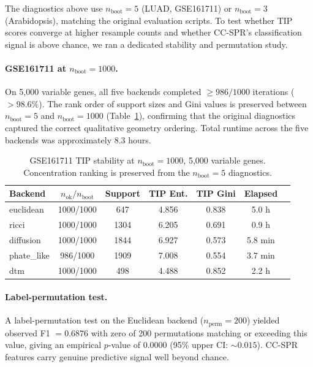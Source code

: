 \documentclass[12pt]{article}
\begin{document}
The diagnostics above use $n_{\text{boot}} = 5$ (LUAD, GSE161711) or $n_{\text{boot}} = 3$ (Arabidopsis), matching the original evaluation scripts.
To test whether TIP scores converge at higher resample counts and whether CC-SPR's classification signal is above chance, we ran a dedicated stability and permutation study.

\paragraph{GSE161711 at $n_{\text{boot}} = 1000$.}
On 5{,}000 variable genes, all five backends completed $\geq 986/1000$ iterations ($> 98.6\%$).
The rank order of support sizes and Gini values is preserved between $n_{\text{boot}} = 5$ and $n_{\text{boot}} = 1000$ (Table~\ref{tab:gse_boot1000}), confirming that the original diagnostics captured the correct qualitative geometry ordering.
Total runtime across the five backends was approximately 8.3 hours.

\begin{table}[h]
\centering\small
\begin{tabular}{@{}lcccccc@{}}
\toprule
Backend & $n_{\text{ok}}/n_{\text{boot}}$ & Support & TIP Ent. & TIP Gini & Elapsed \\
\midrule
euclidean  & 1000/1000 & 647  & 4.856 & 0.838 & 5.0 h \\
ricci      & 1000/1000 & 1304 & 6.205 & 0.691 & 0.9 h \\
diffusion  & 1000/1000 & 1844 & 6.927 & 0.573 & 5.8 min \\
phate\_like & 986/1000 & 1909 & 7.008 & 0.554 & 3.7 min \\
dtm        & 1000/1000 & 498  & 4.488 & 0.852 & 2.2 h \\
\bottomrule
\end{tabular}
\caption{GSE161711 TIP stability at $n_{\text{boot}} = 1000$, 5{,}000 variable genes. Concentration ranking is preserved from the $n_{\text{boot}} = 5$ diagnostics.}
\label{tab:gse_boot1000}
\end{table}

\paragraph{Label-permutation test.}
A label-permutation test on the Euclidean backend ($n_{\text{perm}} = 200$) yielded observed F1 $= 0.6876$ with zero of 200 permutations matching or exceeding this value, giving an empirical $p$-value of $0.0000$ (95\% upper CI: $\sim 0.015$).
CC-SPR features carry genuine predictive signal well beyond chance.
\end{document}
